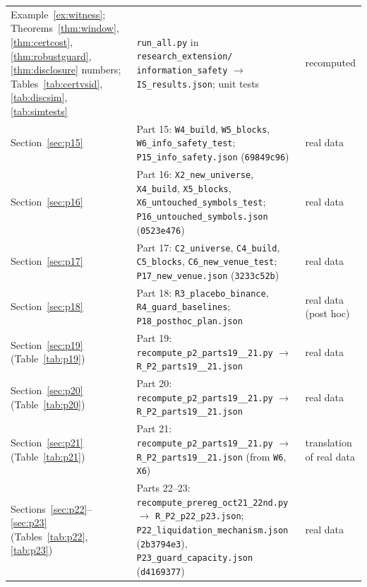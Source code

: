 \documentclass[12pt]{article}
\theoremstyle{definition}
\theoremstyle{remark}
\begin{document}
\begin{longtable}{p{}p{}p{}}
Example~\ref{ex:witness}; Theorems~\ref{thm:window}, \ref{thm:certcost}, \ref{thm:robustguard}, \ref{thm:disclosure} numbers; Tables~\ref{tab:certvsid}, \ref{tab:discsim}, \ref{tab:simtests} & \texttt{run\_all.py} in \texttt{research\_extension/} \texttt{information\_safety} $\to$ \texttt{IS\_results.json}; unit tests & recomputed\\
Section~\ref{sec:p15} & Part 15: \texttt{W4\_build}, \texttt{W5\_blocks}, \texttt{W6\_info\_safety\_test}; \texttt{P15\_info\_safety.json} (\texttt{69849c96}) & real data\\
Section~\ref{sec:p16} & Part 16: \texttt{X2\_new\_universe}, \texttt{X4\_build}, \texttt{X5\_blocks}, \texttt{X6\_untouched\_symbols\_test}; \texttt{P16\_untouched\_symbols.json} (\texttt{0523e476}) & real data\\
Section~\ref{sec:p17} & Part 17: \texttt{C2\_universe}, \texttt{C4\_build}, \texttt{C5\_blocks}, \texttt{C6\_new\_venue\_test}; \texttt{P17\_new\_venue.json} (\texttt{3233c52b}) & real data\\
Section~\ref{sec:p18} & Part 18: \texttt{R3\_placebo\_binance}, \texttt{R4\_guard\_baselines}; \texttt{P18\_posthoc\_plan.json} & real data (post hoc)\\
Section~\ref{sec:p19} (Table~\ref{tab:p19}) & Part 19: \texttt{recompute\_\allowbreak p2\_\allowbreak parts19\_\allowbreak 20\_\allowbreak 21.py} $\to$ \texttt{R\_P2\_\allowbreak parts19\_\allowbreak 20\_\allowbreak 21.json} & real data\\
Section~\ref{sec:p20} (Table~\ref{tab:p20}) & Part 20: \texttt{recompute\_\allowbreak p2\_\allowbreak parts19\_\allowbreak 20\_\allowbreak 21.py} $\to$ \texttt{R\_P2\_\allowbreak parts19\_\allowbreak 20\_\allowbreak 21.json} & real data\\
Section~\ref{sec:p21} (Table~\ref{tab:p21}) & Part 21: \texttt{recompute\_\allowbreak p2\_\allowbreak parts19\_\allowbreak 20\_\allowbreak 21.py} $\to$ \texttt{R\_P2\_\allowbreak parts19\_\allowbreak 20\_\allowbreak 21.json} (from \texttt{W6}, \texttt{X6}) & translation of real data\\
Sections~\ref{sec:p22}--\ref{sec:p23} (Tables~\ref{tab:p22}, \ref{tab:p23}) & Parts 22--23: \texttt{recompute\_\allowbreak prereg\_\allowbreak oct21\_\allowbreak 22nd.py} $\to$ \texttt{R\_P2\_\allowbreak p22\_\allowbreak p23.json}; \texttt{P22\_\allowbreak liquidation\_\allowbreak mechanism.json} (\texttt{2b3794e3}), \texttt{P23\_\allowbreak guard\_\allowbreak capacity.json} (\texttt{d4169377}) & real data\\

\end{longtable}
\end{document}
